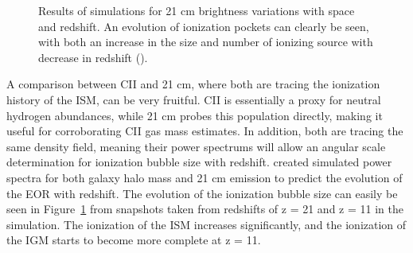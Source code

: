 \documentclass[manuscript]{aastex}
\begin{document}
\begin{figure}[H]
	\centering
	\qquad
	\singlespace
	\caption[21 cm brightness maps for different redshifts. -(\cite{Santos2010})]{Results of simulations for 21 cm brightness variations with space and redshift. An evolution of ionization pockets can clearly be seen, with both an increase in the size and number of ionizing source with decrease in redshift (\cite{Santos2010}).}%
	\label{fig:santos1}%
\end{figure}

A comparison between CII and 21 cm, where both are tracing the ionization history of the ISM, can be very fruitful. CII is essentially a proxy for neutral hydrogen abundances, while 21 cm probes this population directly, making it useful for corroborating CII gas mass estimates. In addition, both are tracing the same density field, meaning their power spectrums will allow an angular scale determination for ionization bubble size with redshift. \cite{Santos2010} created simulated power spectra for both galaxy halo mass and 21 cm emission to predict the evolution of the EOR with redshift. The evolution of the ionization bubble size can easily be seen in Figure~\ref{fig:santos1} from snapshots taken from redshifts of z = 21 and z = 11 in the simulation. The ionization of the ISM increases significantly, and the ionization of the IGM starts to become more complete at z = 11. 
\end{document}
